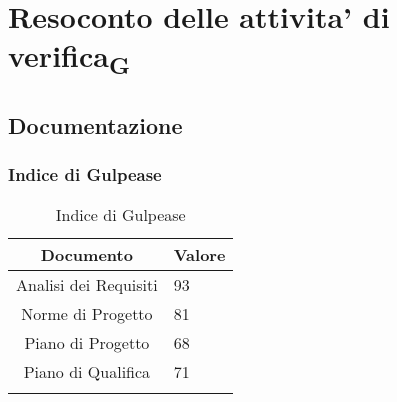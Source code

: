 \section{Resoconto delle attivita' di verifica\textsubscript{G}}

\subsection{Documentazione}

\subsubsection{Indice di Gulpease}

\begin{table}[H]
	\centering
	\renewcommand\tabularxcolumn[1]{>{\Centering}m{#1}}
	\begin{tabularx}{\textwidth}{| c | X |} 
	\hline
	\textbf{Documento} & \textbf{Valore}\\
	\hline
	Analisi dei Requisiti & 93 \\
     	\hline
	Norme di Progetto & 81\\
	\hline
	Piano di Progetto & 68\\
	\hline
	Piano di Qualifica & 71\\
	\hline
    	\caption{Indice di Gulpease}
	\end{tabularx}
\end{table}
